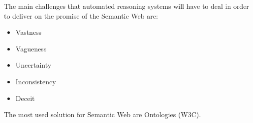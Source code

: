 \begin{frame}
	\begin{block}{}
		The main challenges that automated reasoning systems will have to deal in order to deliver on the promise of the Semantic Web are:
		\begin{itemize}
			\item Vastness
			\item Vagueness
			\item Uncertainty
			\item Inconsistency
			\item Deceit
		\end{itemize}
	\end{block}
	The most used solution for Semantic Web are \alert{Ontologies} (W3C).
\end{frame}